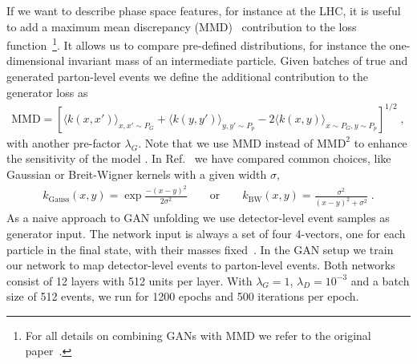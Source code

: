 If we want to describe phase space features, for instance at the LHC,
it is useful to add a maximum mean discrepancy (MMD)~\cite{mmd}
contribution to the loss function~\footnote{For all details on
  combining GANs with MMD we refer to the original
  paper~\cite{gan_phasespace}.}. It allows us to compare pre-defined
distributions, for instance the one-dimensional invariant mass of an
intermediate particle. Given batches of true and generated
parton-level events we define the additional contribution to the
generator loss as
%
\begin{align}
\text{MMD} =
\left[ \langle k\left(x,x'\right)\rangle_{x,x' \sim P_G}
     + \langle k\left(y,y'\right)\rangle_{y,y' \sim P_p}
     - 2 \langle k\left(x,y \right)\rangle_{x\sim P_G,y \sim P_p} \right]^{1/2} \; ,
\label{eq:MMD}
\end{align}
%
with another pre-factor $\lambda_G$. Note that we use $\text{MMD}$ instead
of $\text{MMD}^2$ to enhance the sensitivity of the model \cite{GMMN}. In
Ref.~\cite{gan_phasespace} we have compared common choices, like
Gaussian or Breit-Wigner kernels with a given width $\sigma$,
%
\begin{align}
k_\text{Gauss} \left(x,y\right) = \exp \frac{- \left(x - y\right)^2}{2 \sigma^2}
\qquad \text{or} \qquad
k_\text{BW}\left(x,y\right) = \frac{\sigma^2}{\left(x - y\right)^2 + \sigma^2} \; .
\label{eq:kernels}
\end{align}
%
As a naive approach to GAN unfolding we use detector-level event
samples as generator input. The network input is always a set of four
4-vectors, one for each particle in the final state, with their masses
fixed~\cite{gan_phasespace}.  In the GAN setup we train our network to
map detector-level events to parton-level events.  Both networks
consist of 12 layers with 512 units per layer. With $\lambda_G=1$,
$\lambda_D=10^{-3}$ and a batch size of 512 events, we run for 1200
epochs and 500 iterations per epoch.\medskip

